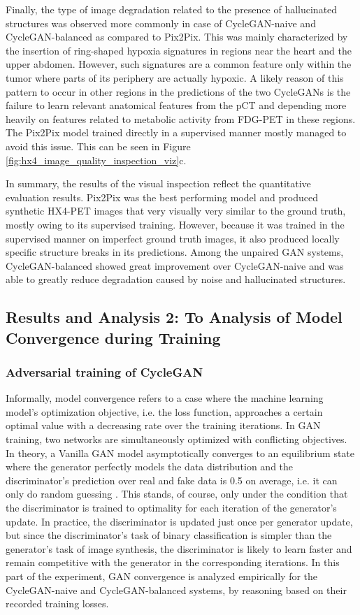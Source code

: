 Finally, the type of image degradation related to the presence of hallucinated structures was observed more commonly in case of CycleGAN-naive and CycleGAN-balanced as compared to Pix2Pix. This was mainly characterized by the insertion of ring-shaped hypoxia signatures in regions near the heart and the upper abdomen. However, such signatures are a common feature only within the tumor where parts of its periphery are actually hypoxic. A likely reason of this pattern to occur in other regions in the predictions of the two CycleGANs is the failure to learn relevant anatomical features from the pCT and depending more heavily on features related to metabolic activity from FDG-PET in these regions. The Pix2Pix model trained directly in a supervised manner mostly managed to avoid this issue. This can be seen in Figure \ref{fig:hx4_image_quality_inspection_viz}c.

In summary, the results of the visual inspection reflect the quantitative evaluation results. Pix2Pix was the best performing model and produced synthetic HX4-PET images that very visually very similar to the ground truth, mostly owing to its supervised training. However, because it was trained in the supervised manner on imperfect ground truth images, it also produced locally specific structure breaks in its predictions. Among the unpaired GAN systems, CycleGAN-balanced showed great improvement over CycleGAN-naive and was able to greatly reduce degradation caused by noise and hallucinated structures.


\subsection{Results and Analysis 2: To Analysis of Model Convergence during Training}
\subsubsection{Adversarial training of CycleGAN} 
Informally, model convergence refers to a case where the machine learning model's optimization objective, i.e. the loss function, approaches a certain optimal value with a decreasing rate over the training iterations. In GAN training, two networks are simultaneously optimized with conflicting objectives. In theory, a Vanilla GAN model asymptotically converges to an equilibrium state where the generator perfectly models the data distribution and the discriminator's prediction over real and fake data is 0.5 on average, i.e. it can only do random guessing \cite{goodfellow2014generative}. This stands, of course, only under the condition that the discriminator is trained to optimality for each iteration of the generator's update. In practice, the discriminator is updated just once per generator update, but since the discriminator's task of binary classification is simpler than the generator's task of image synthesis, the discriminator is likely to learn faster and remain competitive with the generator in the corresponding iterations. In this part of the experiment, GAN convergence is analyzed empirically for the CycleGAN-naive and CycleGAN-balanced systems, by reasoning based on their recorded training losses.

